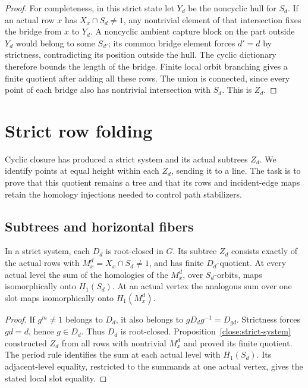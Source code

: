 \begin{proof}
For completeness, in this strict state let $Y_d$ be the noncyclic
hull for $S_d$. If an actual row $x$ has $X_x\cap S_d\ne1$, any
nontrivial element of that intersection fixes the bridge from $x$
to $Y_d$. A noncyclic ambient capture block on the part outside
$Y_d$ would belong to some $S_{d'}$; its common bridge element forces
$d'=d$ by strictness, contradicting its position outside the hull.
The cyclic dictionary therefore bounds the length of the bridge.
Finite local orbit branching gives a finite quotient after adding
all these rows. The union is connected, since every point of each
bridge also has nontrivial intersection with $S_d$. This is $Z_d$.
\end{proof}

\section{Strict row folding}\label{close:strict-folds}

Cyclic closure has produced a strict system and its actual subtrees
$Z_d$. We identify points at equal height within each $Z_d$, sending it
to a line. The task is to prove that this quotient remains a tree and
that its rows and incident-edge maps retain the homology injections
needed to control path stabilizers.

\subsection{Subtrees and horizontal fibers}

\begin{lemma}\label{close:strict-subtrees}
In a strict system, each $D_d$ is root-closed in $G$. Its subtree
$Z_d$ consists exactly of the actual rows with
$M_x^d=X_x\cap S_d\ne1$, and has finite $D_d$-quotient. At every actual
level the sum of the homologies of the $M_x^d$, over $S_d$-orbits, maps
isomorphically onto $H_1(S_d)$. At an actual vertex the analogous sum
over one slot maps isomorphically onto $H_1(M_x^d)$.
\end{lemma}

\begin{proof}
If $g^m\ne1$ belongs to $D_d$, it also belongs to
$gD_dg^{-1}=D_{gd}$. Strictness forces $gd=d$, hence $g\in D_d$.
Thus $D_d$ is root-closed. Proposition~\ref{close:strict-system}
constructed $Z_d$ from all rows with nontrivial $M_x^d$ and proved
its finite quotient. The period rule identifies the sum at each
actual level with $H_1(S_d)$. Its adjacent-level equality,
restricted to the summands at one actual vertex, gives the stated
local slot equality.
\end{proof}

